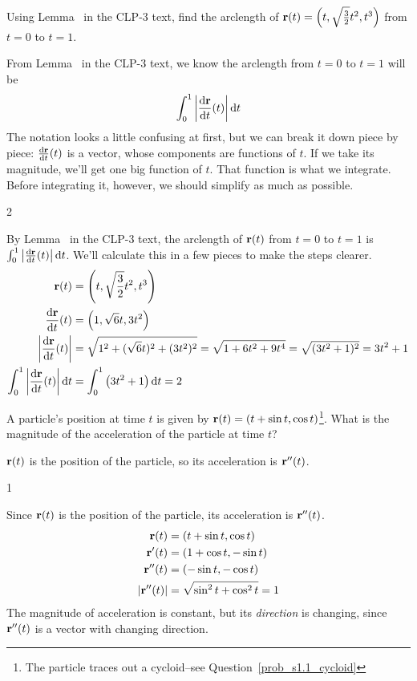 \begin{question}\label{prob_s1.1:lemma113}
Using Lemma~ in the CLP-3 text, find the arclength of $\mathbf{r}(t)=\left(t,\sqrt{\frac{3}{2}}t^2,t^3\right)$ from $t=0$ to $t=1$.
\end{question}
\begin{hint}
From Lemma~ in the CLP-3 text, 
we know the arclength from $t=0$ to $t=1$ will be
\[\int_{0}^1\left| \diff{\vr}{t}(t)\right|\dee t\]
The notation looks a little confusing at first, but we can break it down piece by piece: $\diff{\vr}{t}(t)$ is a vector, whose components are functions of $t$. If we take its magnitude, we'll get one big function of $t$. That function is what we integrate. Before integrating it, however, we should simplify as much as possible.
\end{hint}
\begin{answer}
2
\end{answer}
\begin{solution}
By Lemma~ in the CLP-3 text,  
the arclength of $\mathbf{r}(t)$ from $t=0$ to $t=1$ is
$\int_{0}^1\left| \diff{\vr}{t}(t)\right|\dee t$. We'll calculate this in a few pieces to make the steps clearer.
\begin{align*}
\vr(t)&=\left(t,\sqrt{\frac{3}{2}}t^2,t^3\right)\\
\diff{\vr}{t}(t)&=\left(1,\sqrt{6}t,3t^2\right)\\
\left|\diff{\vr}{t}(t)\right|&=\sqrt{1^2+(\sqrt{6}t)^2+(3t^2)^2}=\sqrt{1+6t^2+9t^4}=\sqrt{(3t^2+1)^2}=3t^2+1\\
\int_{0}^1\left| \diff{\vr}{t}(t)\right|\dee t&=\int_0^1\left(3t^2+1 \right)\dee t=2
\end{align*}
\end{solution}

\begin{question}
A particle's position at time $t$ is given by $\mathbf{r}(t)=(t+\sin t, \cos t)$\footnote{The particle traces out a cycloid--see Question~\ref{prob_s1.1_cycloid}}. What is the magnitude of the acceleration of the particle at time $t$?
\end{question}
\begin{hint}
$\mathbf{r}(t)$ is the position of the particle, so its acceleration is $\mathbf{r}''(t)$.
\end{hint}
\begin{answer}
1
\end{answer}
\begin{solution}
Since $\mathbf{r}(t)$ is the position of the particle,  its acceleration is $\mathbf{r}''(t)$.
\begin{align*}
\mathbf{r}(t)&=(t+\sin t, \cos t)\\
\mathbf{r}'(t)&=(1+\cos t,-\sin t)\\
\mathbf{r}''(t)&=(-\sin t,-\cos t)\\
|\mathbf{r}''(t)|&=\sqrt{\sin^2t+\cos^2t}=1
\end{align*}
The magnitude of acceleration is constant, but its \emph{direction} is changing, since $\mathbf{r}''(t)$ is a vector with changing direction.
\end{solution}



